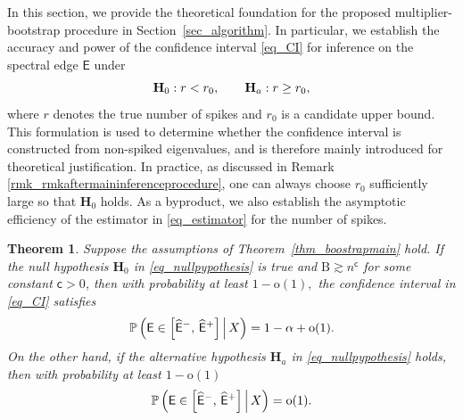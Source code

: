 \documentclass[12pt]{article}
\theoremstyle{plain}
\newtheorem{theorem}{Theorem}[section]
\numberwithin{equation}{section}
\begin{document}
In this section, we provide the theoretical foundation for the proposed multiplier-bootstrap procedure in Section~\ref{sec_algorithm}. In particular, we establish the accuracy and power of the confidence interval \eqref{eq_CI} for inference on the spectral edge $\mathsf E$ under \vspace*{-10pt}
\begin{equation}
	\vspace*{-10pt}
	\mathbf H_0:r<r_0,
	\qquad
	\mathbf H_a:r\ge r_0,
	\label{eq_nullpypothesis}
\end{equation}
where $r$ denotes the true number of spikes and $r_0$ is a candidate upper bound. This formulation is used to determine whether the confidence interval is constructed from non-spiked eigenvalues, and is therefore mainly introduced for theoretical justification. In practice, as discussed in Remark \ref{rmk_rmkaftermaininferenceprocedure}, one can always choose $r_0$ sufficiently large so that $\mathbf H_0$ holds. As a byproduct, we also establish the asymptotic efficiency of the estimator in \eqref{eq_estimator} for the number of spikes.



\begin{theorem}\label{thm_power}
	Suppose the assumptions of Theorem~\ref{thm_boostrapmain} hold. If the null hypothesis $\mathbf H_0$ in \eqref{eq_nullpypothesis} is true and $\mathrm{B}\gtrsim n^{\mathsf{c}}$ for some constant $\mathsf{c}>0$, then with probability at least $1-\mathrm{o}(1),$ the confidence interval in \eqref{eq_CI} satisfies \vspace*{-10pt}
	\begin{equation}\label{eq_thmpower_one}
		\vspace*{-10pt}
		\mathbb{P}\left(
		\mathsf E \in \left[\widehat{\mathsf E}^-,\,\widehat{\mathsf E}^+\right] \,\middle|\, X
		\right)
		=
		1-\alpha+\mathrm{o}(1).
	\end{equation}
	On the other hand, if the alternative hypothesis $\mathbf H_a$ in \eqref{eq_nullpypothesis} holds, then with probability at least $1-\mathrm{o}(1)$ \vspace*{-10pt}
	\begin{equation}\label{eq_thmpower_two}
		\vspace*{-10pt}
		\mathbb{P}\left(
		\mathsf E \in \left[\widehat{\mathsf E}^-,\,\widehat{\mathsf E}^+\right] \,\middle|\, X
		\right)
		=
		\mathrm{o}(1).
	\end{equation}
\end{theorem}
\end{document}
